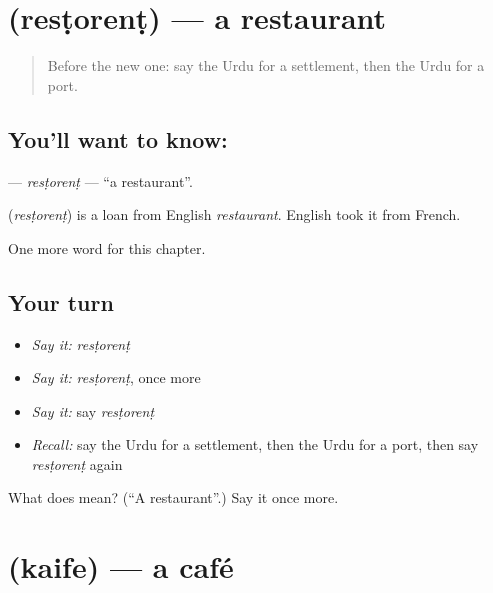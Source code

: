 \section[\texorpdfstring{\ur{ریسٹورنٹ} (resṭorenṭ)}{ریسٹورنٹ (resṭorenṭ)}]{ (resṭorenṭ) — a restaurant}

\label{lesson:UR-C158-restorent}



\begin{quote}
Before the new one: say the Urdu for a settlement, then the Urdu for a port.
\end{quote}

\subsection*{You'll want to know: }
\textbf{} — \emph{resṭorenṭ} — \textquotedblleft{}a restaurant\textquotedblright{}.

\begin{cousinweb}
\textbf{} (\emph{resṭorenṭ}) is a loan from English \emph{restaurant}. English took it from French.
\end{cousinweb}

\begin{grammarlens}[title={What you've built}]
One more word for this chapter.
\end{grammarlens}

\subsection*{Your turn}
\begin{itemize}
\raggedright
  \item \emph{Say it:} \emph{resṭorenṭ}
  \item \emph{Say it:} \emph{resṭorenṭ}, once more
  \item \emph{Say it:} say \emph{resṭorenṭ}
  \item \emph{Recall:} say the Urdu for a settlement, then the Urdu for a port, then say \emph{resṭorenṭ} again
\end{itemize}

\begin{tcolorbox}[breakable,colback=teal!4,colframe=teal!35!black,title={Before you move on}]
What does  mean? (\textquotedblleft{}A restaurant\textquotedblright{}.) Say it once more.
\end{tcolorbox}
\section[\texorpdfstring{\ur{کیفے} (kaife)}{کیفے (kaife)}]{ (kaife) — a café}

